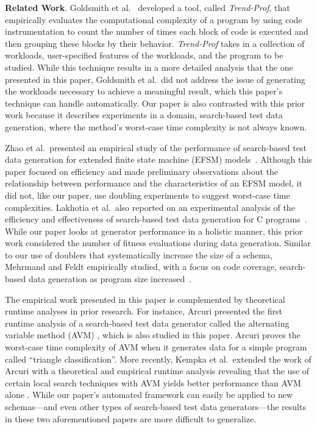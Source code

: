 {\bf Related Work}. Goldsmith et al.~\cite{Goldsmith2007} developed a tool, called \textit{Trend-Prof}, that empirically
evaluates the computational complexity of a program by using code instrumentation to count the number of times each
block of code is executed and then grouping these blocks by their behavior.  \textit{Trend-Prof} takes in a collection
of workloads, user-specified features of the workloads, and the program to be studied. While this technique results in a
more detailed analysis that the one presented in this paper, Goldsmith et al.\ did not address the issue of generating
the workloads necessary to achieve a meaningful result, which this paper's technique can handle automatically.  Our
paper is also contrasted with this prior work because it describes experiments in a domain, search-based test data
generation, where the method's worst-case time complexity is not always known.

Zhao et al.\ presented an empirical study of the performance of search-based test data generation for extended finite
state machine (EFSM) models~\cite{zhao2010}. Although this paper focused on efficiency and made preliminary observations
about the relationship between performance and the characteristics of an EFSM model, it did not, like our paper, use
doubling experiments to suggest worst-case time complexities.  Lakhotia et al.\ also reported on an experimental
analysis of the efficiency and effectiveness of search-based test data generation for C programs~\cite{lakhotia2013}.
While our paper looks at generator performance in a holistic manner, this prior work considered the number of fitness
evaluations during data generation. Similar to our use of doublers that systematically increase the size of a
schema, Mehrmand and Feldt empirically studied, with a focus on code coverage, search-based data generation as program size
increased~\cite{mehrmand2010}.



The empirical work presented in this paper is complemented by theoretical runtime analyses in prior research.  For
instance, Arcuri presented the first runtime analysis of a search-based test data generator called the alternating
variable method (AVM) \cite{arcuri2009}, which is also studied in this paper. Arcuri proves the worst-case time
complexity of AVM when it generates data for a simple program called ``triangle classification''. More recently, Kempka
et al.\ extended the work of Arcuri with a theoretical and empirical runtime analysis revealing that the use of certain
local search techniques with AVM yields better performance than AVM alone \cite{kempka2015}.  While our paper's
automated framework can easily be applied to new schemas---and even other types of search-based test data
generators---the results in these two aforementioned papers are more difficult to generalize.


